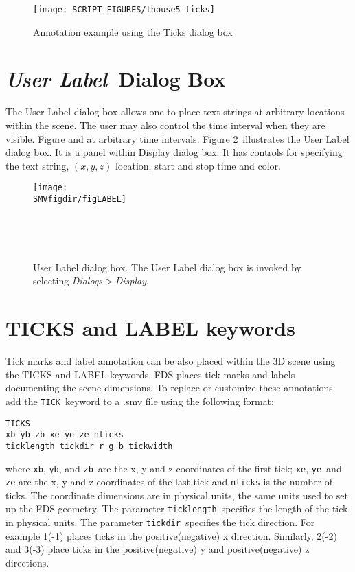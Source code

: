 \documentclass[11pt,twoside]{book}
\begin{document}
\begin{figure}[bph]
\begin{center}
\texttt{[image: SCRIPT\_FIGURES/thouse5\_ticks]}
\end{center}
\caption{Annotation example using the Ticks dialog box}
\label{figTICKSdialogexample}%
\end{figure}

\section{{\em User Label}\ Dialog Box}
The User Label dialog box allows one to place
text strings at arbitrary locations within the scene.  The user may also
control the time interval when they are visible.  Figure  and at arbitrary time intervals.
Figure \ref{figLABELdialog}\ illustrates the User Label
dialog box.  It is a panel within Display dialog box.
It has controls for specifying the text string, $(x,y,z)$ location,
start and stop time and color.

\begin{figure}[bph]
\centerline{
\texttt{[image: \\SMVfigdir/figLABEL]}
}\ \caption[User Label dialog box.]{User Label dialog
box. The User Label dialog box is invoked by selecting {\em
Dialogs$>$Display}. }\ \label{figLABELdialog}
\end{figure}



\section{TICKS and LABEL keywords}
Tick marks and label annotation
can be also placed within the 3D scene using the TICKS and LABEL keywords.
FDS places tick marks and labels
documenting the scene dimensions.  To replace or customize
these annotations add the {\tt TICK}\ keyword to a .smv file
using the following format:

\begin{lstlisting}
TICKS
xb yb zb xe ye ze nticks
ticklength tickdir r g b tickwidth
\end{lstlisting}

\noindent where {\tt xb}, {\tt yb}, and {\tt zb}\ are the x, y and
z coordinates of the first tick; {\tt xe}, {\tt ye}\ and {\tt ze}
are the x, y and z coordinates of the last tick and {\tt nticks}
is the number of ticks. The coordinate dimensions are in physical
units, the same units used to set up the FDS geometry. The
parameter {\tt ticklength}\ specifies the length of the tick in
physical units. The parameter {\tt tickdir}\ specifies the tick
direction.  For example 1(-1) places ticks in the
positive(negative) x direction. Similarly, 2(-2) and 3(-3) place
ticks in the positive(negative) y and positive(negative) z
directions.
\end{document}
